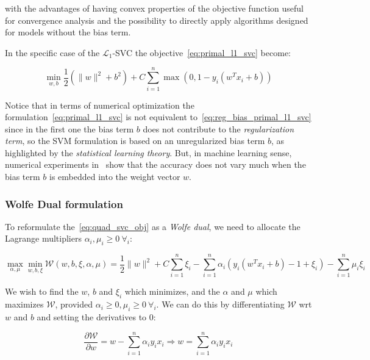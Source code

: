 with the advantages of having convex properties of the objective function useful for convergence analysis and the possibility to directly apply algorithms designed for models without the bias term.

In the specific case of the $\mathcal{L}_1$-SVC the objective~\eqref{eq:primal_l1_svc} become:

\begin{equation} \label{eq:reg_bias_primal_l1_svc}
    \min_{w,b} \frac{1}{2} (\| w \|^2 + b^2) + C \sum_{i=1}^n \max(0, 1 - y_i (w^T x_i + b))
\end{equation}

Notice that in terms of numerical optimization the formulation~\eqref{eq:primal_l1_svc} is not equivalent to~\eqref{eq:reg_bias_primal_l1_svc} since in the first one the bias term $b$ does not contribute to the \emph{regularization term}, so the SVM formulation is based on an unregularized bias term $b$, as highlighted by the \emph{statistical learning theory}. But, in machine learning sense, numerical experiments in~\cite{hsu2002simple} show that the accuracy does not vary much when the bias term $b$ is embedded into the weight vector $w$.

\subsubsection{Wolfe Dual formulation}

To reformulate the~\eqref{eq:quad_svc_obj} as a \emph{Wolfe dual}, we need to allocate the Lagrange multipliers $\alpha_i, \mu_i \geq 0 \ \forall_i$:

\begin{equation} \label{eq:svc_wolfe_dual}
    \max_{\alpha,\mu} \min_{w,b,\xi} \mathcal{W}(w,b,\xi,\alpha,\mu) = \frac{1}{2} \| w \|^2 + C \sum_{i=1}^n \xi_i-\sum_{i=1}^n \alpha_i(y_i(w^T x_i + b)-1+\xi_i)-\sum_{i=1}^n\mu_i\xi_i
\end{equation}

We wish to find the $w$, $b$ and $\xi_i$ which minimizes, and the $\alpha$ and $\mu$ which maximizes $\mathcal{W}$, provided $\alpha_i\geq 0, \mu_i \geq 0 \ \forall_i$. We can do this by differentiating $\mathcal{W}$ wrt $w$ and $b$ and setting the derivatives to 0:

\begin{equation} \label{eq:svc_wolfe_der_w}
	\frac{\partial \mathcal{W}}{\partial w}=w-\sum_{i=1}^n \alpha_i y_i x_i \Rightarrow w=\sum_{i=1}^n \alpha_i y_i x_i
\end{equation}

